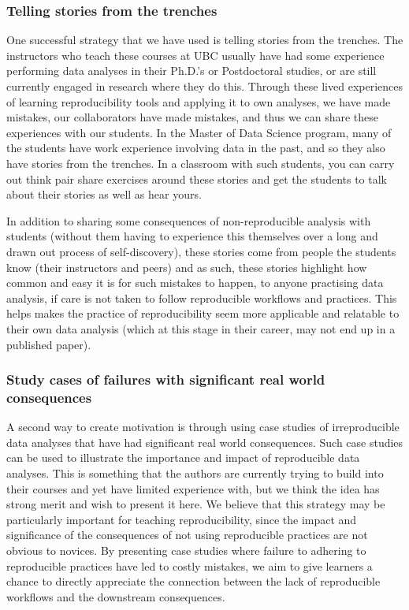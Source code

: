 \documentclass{article}
\begin{document}
\hypertarget{telling-stories-from-the-trenches}{%
\subsubsection{Telling stories from the
trenches}\label{telling-stories-from-the-trenches}}

One successful strategy that we have used is telling stories from the
trenches. The instructors who teach these courses at UBC usually have
had some experience performing data analyses in their Ph.D.'s or
Postdoctoral studies, or are still currently engaged in research where
they do this. Through these lived experiences of learning
reproducibility tools and applying it to own analyses, we have made
mistakes, our collaborators have made mistakes, and thus we can share
these experiences with our students. In the Master of Data Science
program, many of the students have work experience involving data in the
past, and so they also have stories from the trenches. In a classroom
with such students, you can carry out think pair share exercises around
these stories and get the students to talk about their stories as well
as hear yours.

In addition to sharing some consequences of non-reproducible analysis
with students (without them having to experience this themselves over a
long and drawn out process of self-discovery), these stories come from
people the students know (their instructors and peers) and as such,
these stories highlight how common and easy it is for such mistakes to
happen, to anyone practising data analysis, if care is not taken to
follow reproducible workflows and practices. This helps makes the
practice of reproducibility seem more applicable and relatable to their
own data analysis (which at this stage in their career, may not end up
in a published paper).

\hypertarget{study-cases-of-failures-with-significant-real-world-consequences}{%
\subsubsection{Study cases of failures with significant real world
consequences}\label{study-cases-of-failures-with-significant-real-world-consequences}}

A second way to create motivation is through using case studies of
irreproducible data analyses that have had significant real world
consequences. Such case studies can be used to illustrate the importance
and impact of reproducible data analyses. This is something that the
authors are currently trying to build into their courses and yet have
limited experience with, but we think the idea has strong merit and wish
to present it here. We believe that this strategy may be particularly
important for teaching reproducibility, since the impact and
significance of the consequences of not using reproducible practices are
not obvious to novices. By presenting case studies where failure to
adhering to reproducible practices have led to costly mistakes, we aim
to give learners a chance to directly appreciate the connection between
the lack of reproducible workflows and the downstream consequences.
\end{document}
